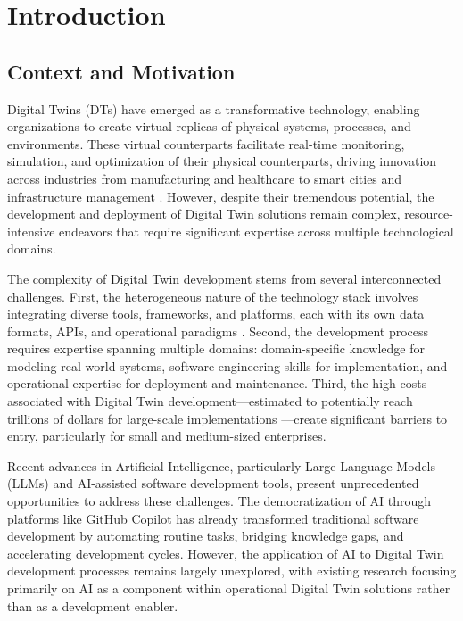 
\chapter{Introduction}

\section{Context and Motivation}

Digital Twins (DTs) have emerged as a transformative technology, enabling organizations to create virtual replicas of physical systems, processes, and environments. These virtual counterparts facilitate real-time monitoring, simulation, and optimization of their physical counterparts, driving innovation across industries from manufacturing and healthcare to smart cities and infrastructure management \cite{digital_twin_survey}. However, despite their tremendous potential, the development and deployment of Digital Twin solutions remain complex, resource-intensive endeavors that require significant expertise across multiple technological domains.

The complexity of Digital Twin development stems from several interconnected challenges. First, the heterogeneous nature of the technology stack involves integrating diverse tools, frameworks, and platforms, each with its own data formats, APIs, and operational paradigms \cite{enabling_technologies}. Second, the development process requires expertise spanning multiple domains: domain-specific knowledge for modeling real-world systems, software engineering skills for implementation, and operational expertise for deployment and maintenance. Third, the high costs associated with Digital Twin development—estimated to potentially reach trillions of dollars for large-scale implementations \cite{cost_estimation}—create significant barriers to entry, particularly for small and medium-sized enterprises.

Recent advances in Artificial Intelligence, particularly Large Language Models (LLMs) and AI-assisted software development tools, present unprecedented opportunities to address these challenges. The democratization of AI through platforms like GitHub Copilot has already transformed traditional software development by automating routine tasks, bridging knowledge gaps, and accelerating development cycles. However, the application of AI to Digital Twin development processes remains largely unexplored, with existing research focusing primarily on AI as a component within operational Digital Twin solutions rather than as a development enabler.

